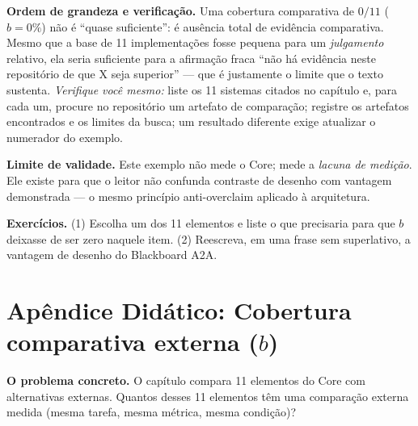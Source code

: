 \begin{resultado}
\textbf{Ordem de grandeza e verificação.} Uma cobertura comparativa de $0/11$
($b = 0\%$) não é ``quase suficiente'': é ausência total de evidência
comparativa. Mesmo que a base de 11 implementações fosse pequena para um
\emph{julgamento} relativo, ela seria suficiente para a afirmação fraca
``não há evidência neste repositório de que X seja superior'' --- que é
justamente o limite que o texto sustenta. \emph{Verifique você mesmo:} liste os 11
sistemas citados no capítulo e, para cada um, procure no repositório um artefato de
comparação; registre os artefatos encontrados e os limites da busca; um resultado diferente exige atualizar o numerador do exemplo.
\end{resultado}

\begin{aviso}
\textbf{Limite de validade.} Este exemplo não mede o Core; mede a \emph{lacuna de
medição}. Ele existe para que o leitor não confunda contraste de desenho com
vantagem demonstrada --- o mesmo princípio anti-overclaim aplicado à arquitetura.
\end{aviso}

\begin{resultado}
\textbf{Exercícios.} (1) Escolha um dos 11 elementos e liste o que precisaria para
que $b$ deixasse de ser zero naquele item. (2) Reescreva, em uma frase sem superlativo, a vantagem de desenho do Blackboard A2A.
\end{resultado}

\clearpage
\section[Apêndice Didático: Cobertura comparativa externa]{Apêndice Didático: Cobertura comparativa externa ($b$)}


\begin{descricao}
\textbf{O problema concreto.} O capítulo compara 11 elementos do Core com alternativas externas. Quantos desses 11 elementos têm uma comparação externa medida (mesma tarefa, mesma métrica, mesma condição)?
\end{descricao}

